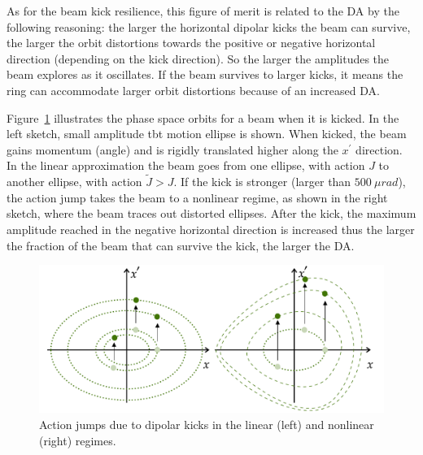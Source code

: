 As for the beam kick resilience, this figure of merit is related to the \gls*{DA} by the following reasoning: the larger the horizontal dipolar kicks the beam can survive, the larger the orbit distortions towards the positive or negative horizontal direction (depending on the kick direction). So the larger the amplitudes the beam explores as it oscillates. If the beam survives to larger kicks, it means the ring can accommodate larger orbit distortions because of an increased \gls*{DA}.

Figure~\ref{fig:action_jump} illustrates the phase space orbits for a beam when it is kicked. In the left sketch, small amplitude \gls*{tbt} motion ellipse is shown. When kicked, the beam gains momentum (angle) and is rigidly translated higher along the $x^{\prime}$ direction. In the linear approximation the beam goes from one ellipse, with action $J$ to another ellipse, with action $\tilde{J}>J$. If the kick is stronger (larger than $500~\unit{\mu rad}$), the action jump takes the beam to a nonlinear regime, as shown in the right sketch, where the beam traces out distorted ellipses. After the kick, the maximum amplitude reached in the negative horizontal direction is increased thus the larger the fraction of the beam that can survive the kick, the larger the \gls*{DA}.

\begin{figure}
    \centering
    \includegraphics[width=\textwidth]{Images/phase_space_kick.pdf}
    \caption[Action jumps due to dipolar kicks in the linear and nonlinear regimes.]{Action jumps due to dipolar kicks in the linear (left) and nonlinear (right) regimes.}
    \label{fig:action_jump}
\end{figure}


